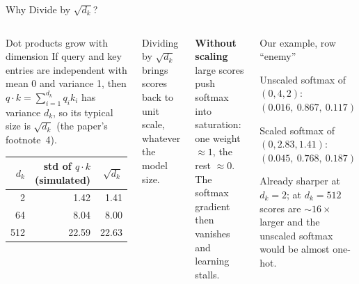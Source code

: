 \documentclass[aspectratio=169,10pt]{beamer}
\begin{document}
\begin{frame}{Why Divide by $\sqrt{d_k}$?}
\begin{columns}[T]
\begin{cbox}{Dot products grow with dimension}
If query and key entries are independent with mean 0 and variance 1, then $q\cdot k=\sum_{i=1}^{d_k}q_ik_i$ has variance $d_k$, so its typical size is $\sqrt{d_k}$ (the paper's footnote~4).
\begin{center}\small\renewcommand{\arraystretch}{1.1}
\begin{tabular}{rrr}
\toprule $d_k$ & std of $q\cdot k$ (simulated) & $\sqrt{d_k}$\\\midrule
2 & 1.42 & 1.41\\ 64 & 8.04 & 8.00\\ 512 & 22.59 & 22.63\\\bottomrule
\end{tabular}\end{center}
\end{cbox}
\begin{rbox}\scriptsize Dividing by $\sqrt{d_k}$ brings scores back to unit scale, whatever the model size.\end{rbox}
\begin{wbox}\scriptsize\textbf{Without scaling} large scores push softmax into saturation: one weight $\approx1$, the rest $\approx0$. The softmax gradient then vanishes and learning stalls.\end{wbox}
\begin{cbox}{Our example, row ``enemy''}
\begin{tl}
\item Unscaled softmax of $(0,4,2)$: $(0.016,\ \mathbf{0.867},\ 0.117)$
\item Scaled softmax of $(0,2.83,1.41)$: $(0.045,\ \mathbf{0.768},\ 0.187)$
\end{tl}
Already sharper at $d_k=2$; at $d_k=512$ scores are $\sim\!16\times$ larger and the unscaled softmax would be almost one-hot.
\end{cbox}
\end{columns}
\end{frame}
\end{document}
